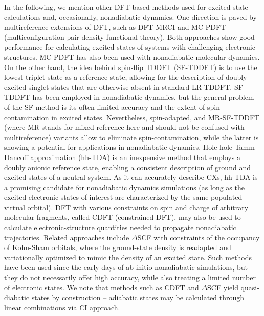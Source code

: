 \documentclass[9pt,bestpractices]{livecoms}
\begin{document}
In the following, we mention other DFT-based methods used for excited-state calculations and, occasionally, nonadiabatic dynamics. One direction is paved by multireference extensions of DFT, such as DFT-MRCI\cite{grimme1999combination} and MC-PDFT (multiconfiguration pair-density functional theory).\cite{gagliardi2017multiconfiguration} Both approaches show good performance for calculating excited states of systems with challenging electronic structures. MC-PDFT has also been used with nonadiabatic molecular dynamics.\cite{calio2022nonadiabatic} On the other hand, the idea behind spin-flip TDDFT (SF-TDDFT)\cite{herbert2022spin} is to use the lowest triplet state as a reference state, allowing for the description of doubly-excited singlet states that are otherwise absent in standard LR-TDDFT. SF-TDDFT has been employed in nonadiabatic dynamics,\cite{minezawa2019trajectory,yue2018performance} but the general problem of the SF method is its often limited accuracy and the extent of spin-contamination in excited states. Nevertheless, spin-adapted,\cite{zhang2015spin} and MR-SF-TDDFT\cite{lee2018eliminating} (where MR stands for mixed-reference here and should not be confused with multireference) variants allow to eliminate spin-contamination, while the latter is showing a potential for applications in nonadiabatic dynamics.\cite{lee2025expanding}  Hole-hole Tamm-Dancoff approximation (hh-TDA) is an inexpensive method that employs a doubly anionic reference state, enabling a consistent description of ground and excited states of a neutral system.\cite{bannwarth_holehole_2020} As it can accurately describe CXs, hh-TDA is a promising candidate for nonadiabatic dynamics simulations (as long as the excited electronic states of interest are characterized by the same populated virtual orbital).\cite{yu_ab_2020}
DFT with various constraints on spin and charge of arbitrary molecular fragments, called CDFT (constrained DFT),\cite{kaduk2012constrained} may also be used to calculate electronic-structure quantities needed to propagate nonadiabatic trajectories\cite{krenz2020photochemical}. Related approaches include $\Delta$SCF with constraints of the occupancy of Kohn-Sham orbitals, where the ground-state density is readapted and variationally optimized to mimic the density of an excited state.\cite{kaduk2012constrained,vandaele2022deltascf} Such methods have been used since the early days of ab initio nonadiabatic simulations,\cite{doltsinis02b} but they do not necessarily offer high accuracy, while also treating a limited number of electronic states. We note that methods such as CDFT and $\Delta$SCF yield quasi-diabatic states by construction -- adiabatic states may be calculated through linear combinations via CI approach.
\end{document}
